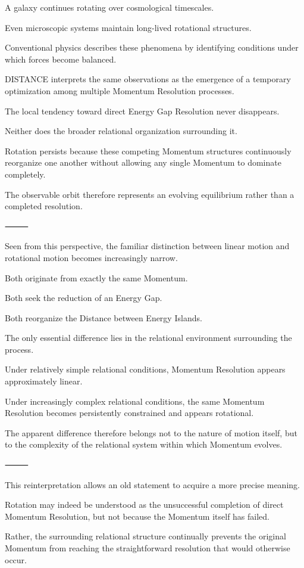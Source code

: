 A galaxy continues rotating over cosmological timescales.

Even microscopic systems maintain long-lived rotational structures.

Conventional physics describes these phenomena by identifying conditions under which forces become balanced.

DISTANCE interprets the same observations as the emergence of a temporary optimization among multiple Momentum Resolution processes.

The local tendency toward direct Energy Gap Resolution never disappears.

Neither does the broader relational organization surrounding it.

Rotation persists because these competing Momentum structures continuously reorganize one another without allowing any single Momentum to dominate completely.

The observable orbit therefore represents an evolving equilibrium rather than a completed resolution.

⸻

Seen from this perspective, the familiar distinction between linear motion and rotational motion becomes increasingly narrow.

Both originate from exactly the same Momentum.

Both seek the reduction of an Energy Gap.

Both reorganize the Distance between Energy Islands.

The only essential difference lies in the relational environment surrounding the process.

Under relatively simple relational conditions, Momentum Resolution appears approximately linear.

Under increasingly complex relational conditions, the same Momentum Resolution becomes persistently constrained and appears rotational.

The apparent difference therefore belongs not to the nature of motion itself, but to the complexity of the relational system within which Momentum evolves.

⸻

This reinterpretation allows an old statement to acquire a more precise meaning.

Rotation may indeed be understood as the unsuccessful completion of direct Momentum Resolution, but not because the Momentum itself has failed.

Rather, the surrounding relational structure continually prevents the original Momentum from reaching the straightforward resolution that would otherwise occur.

